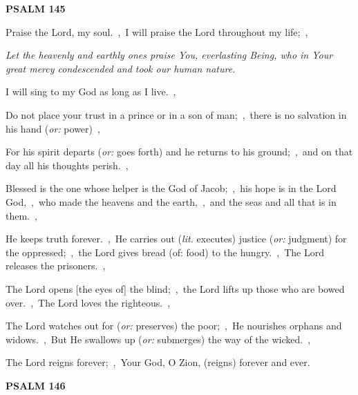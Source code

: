 \documentclass[12pt,twoside,a5paper]{article}
\newcommand{\psalm}[1]{\textbf{PSALM {#1}}\nopagebreak}
\newcommand{\qanona}[1]{{\liturgicalhint{Qanona.} \emph{#1}}}
\newcommand{\translationoption}[1]{\emph{or:} #1}
\newcommand{\translationliteral}[1]{\emph{lit.} #1}
\begin{document}
\psalm{145}

\begin{normalparskip}
  Praise the Lord, my soul.~\sep\ I will praise the Lord throughout my life;~\sep

  \qanona{Let the heavenly and earthly ones praise You, everlasting Being, who in Your great mercy condescended and took our human nature.}

  I will sing to my God as long as I live.~\sep

  Do not place your trust in a prince or in a son of man;~\sep\ there is no salvation in his hand (\translationoption{power})~\sep

  For his spirit departs (\translationoption{goes forth}) and he returns to his ground;~\sep\ and on that day all his thoughts perish.~\sep

  Blessed is the one whose helper is the God of Jacob;~\sep\ his hope is in the Lord God,~\sep\ who made the heavens and the earth,~\sep\ and the seas and all that is in them.~\sep

  He keeps truth forever.~\sep\ He carries out (\translationliteral{executes}) justice (\translationoption{judgment}) for the oppressed;~\sep\ the Lord gives bread (of: food) to the hungry.~\sep\ The Lord releases the prisoners.~\sep

  The Lord opens [the eyes of] the blind;~\sep\ the Lord lifts up those who are bowed over.~\sep\ The Lord loves the righteous.~\sep

  The Lord watches out for (\translationoption{preserves}) the poor;~\sep\ He nourishes orphans and widows.~\sep\ But He swallows up (\translationoption{submerges}) the way of the wicked.~\sep

  The Lord reigns forever;~\sep\ Your God, O Zion, (reigns) forever and ever.
\end{normalparskip}

\psalm{146}
\end{document}
